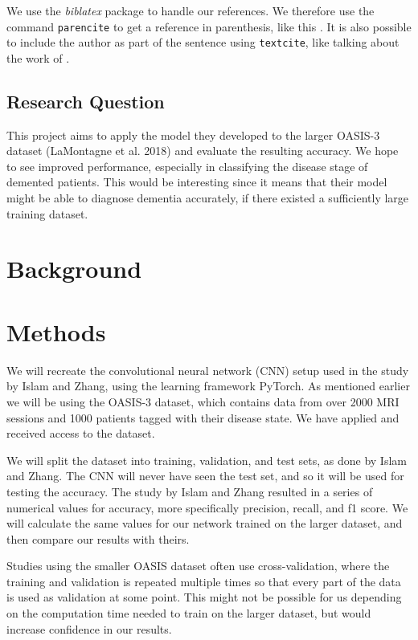 \documentclass{kththesis}
\begin{document}
We use the \emph{biblatex} package to handle our references.  We therefore use the
command \texttt{parencite} to get a reference in parenthesis, like this
\parencite{heisenberg2015}.  It is also possible to include the author
as part of the sentence using \texttt{textcite}, like talking about
the work of \textcite{einstein2016}.

\section{Research Question}
This project aims to apply the model they developed to the larger OASIS-3 dataset (LaMontagne et al. 2018) and evaluate the resulting accuracy. We hope to see improved performance, especially in classifying the disease stage of demented patients. This would be interesting since it means that their model might be able to diagnose dementia accurately, if there existed a sufficiently large training dataset.

\chapter{Background}

\chapter{Methods}
We will recreate the convolutional neural network (CNN) setup used in the study by Islam and Zhang, using the learning framework PyTorch. As mentioned earlier we will be using the OASIS-3 dataset, which contains data from over 2000 MRI sessions and 1000 patients tagged with their disease state. We have applied and received access to the dataset. 

We will split the dataset into training, validation, and test sets, as done by Islam and Zhang. The CNN will never have seen the test set, and so it will be used for testing the accuracy. The study by Islam and Zhang resulted in a series of numerical values for accuracy, more specifically precision, recall, and f1 score. We will calculate the same values for our network trained on the larger dataset, and then compare our results with theirs. 

Studies using the smaller OASIS dataset often use cross-validation, where the training and validation is repeated multiple times so that every part of the data is used as validation at some point. This might not be possible for us depending on the computation time needed to train on the larger dataset, but would increase confidence in our results.
\end{document}
